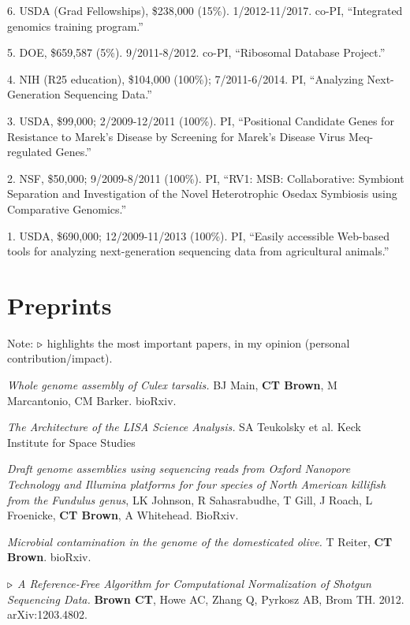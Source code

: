 \documentclass[margin,line]{resume}
\begin{document}
\begin{resume}
6. USDA (Grad Fellowships), \$238,000 (15\%).  1/2012-11/2017.  co-PI, ``Integrated genomics training program.''

5. DOE, \$659,587 (5\%).  9/2011-8/2012.  co-PI, ``Ribosomal Database Project.''

4. NIH (R25 education), \$104,000 (100\%); 7/2011-6/2014.  PI, ``Analyzing Next-Generation Sequencing Data.''

3. USDA, \$99,000; 2/2009-12/2011 (100\%).  PI, ``Positional Candidate Genes for Resistance to Marek's
Disease by Screening for Marek's Disease Virus Meq-regulated Genes.''

2. NSF, \$50,000; 9/2009-8/2011 (100\%).  PI, ``RV1: MSB: Collaborative: Symbiont Separation and Investigation of the Novel Heterotrophic Osedax Symbiosis using Comparative Genomics.''

1. USDA, \$690,000; 12/2009-11/2013 (100\%).  PI, ``Easily accessible Web-based tools for analyzing next-generation sequencing data from agricultural animals.''


    \section{\mysidestyle Preprints}

Note: {\color{red} ${\bf \triangleright}$} highlights the most important
papers, in my opinion (personal contribution/impact).

{\em Whole genome assembly of Culex tarsalis.} BJ Main, {\bf CT Brown}, M Marcantonio, CM Barker. bioRxiv.

{\em The Architecture of the LISA Science Analysis.} SA Teukolsky et al.
Keck Institute for Space Studies

{\em Draft genome assemblies using sequencing reads from Oxford Nanopore Technology and Illumina platforms for four species of North American killifish from the Fundulus genus}, LK Johnson, R Sahasrabudhe, T Gill, J Roach, L Froenicke, {\bf CT Brown}, A Whitehead. BioRxiv.

{\em Microbial contamination in the genome of the domesticated olive.} T Reiter, {\bf CT Brown}. bioRxiv.

{\color{red} ${\bf \triangleright}$}
{\em A Reference-Free Algorithm for Computational Normalization of Shotgun Sequencing Data.} {\bf Brown CT}, Howe AC, Zhang Q, Pyrkosz AB, Brom TH. 2012. arXiv:1203.4802.


\end{resume}
\end{document}
